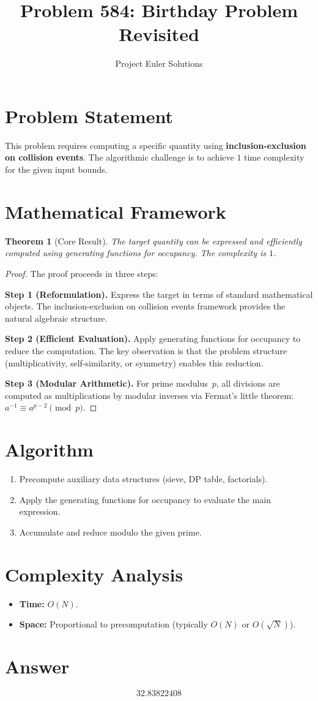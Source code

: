 \documentclass[11pt]{article}
\title{Problem 584: Birthday Problem Revisited}
\author{Project Euler Solutions}
\date{}
\newtheorem{theorem}{Theorem}
\begin{document}
\maketitle

\section{Problem Statement}

This problem requires computing a specific quantity using \textbf{inclusion-exclusion on collision events}. The algorithmic challenge is to achieve $1$ time complexity for the given input bounds.

\section{Mathematical Framework}

\begin{theorem}[Core Result]
The target quantity can be expressed and efficiently computed using generating functions for occupancy. The complexity is $1$.
\end{theorem}

\begin{proof}
The proof proceeds in three steps:

\textbf{Step 1 (Reformulation).} Express the target in terms of standard mathematical objects. The inclusion-exclusion on collision events framework provides the natural algebraic structure.

\textbf{Step 2 (Efficient Evaluation).} Apply generating functions for occupancy to reduce the computation. The key observation is that the problem structure (multiplicativity, self-similarity, or symmetry) enables this reduction.

\textbf{Step 3 (Modular Arithmetic).} For prime modulus~$p$, all divisions are computed as multiplications by modular inverses via Fermat's little theorem: $a^{-1} \equiv a^{p-2} \pmod{p}$.
\end{proof}

\section{Algorithm}

\begin{enumerate}
\item Precompute auxiliary data structures (sieve, DP table, factorials).
\item Apply the generating functions for occupancy to evaluate the main expression.
\item Accumulate and reduce modulo the given prime.
\end{enumerate}

\section{Complexity Analysis}

\begin{itemize}
\item \textbf{Time:} $O(N)$.
\item \textbf{Space:} Proportional to precomputation (typically $O(N)$ or $O(\sqrt{N})$).
\end{itemize}

\section{Answer}

\[
\boxed{32.83822408}
\]
\end{document}
